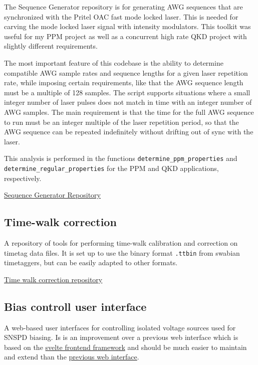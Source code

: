 \documentclass[11pt]{caltech_thesis} %
\begin{document}
The Sequence Generator repository is for generating AWG sequences that are synchronized with the Pritel OAC fast mode locked laser. This is needed for carving the mode locked laser signal with intensity modulators. This toolkit was useful for my PPM project as well as a concurrent high rate QKD project with slightly different requirements.

The most important feature of this codebase is the ability to determine compatible AWG sample rates and sequence lengths for a given laser repetition rate, while imposing certain requirements, like that the AWG sequence length must be a multiple of 128 samples. The script supports situations where a small integer number of laser pulses does not match in time with an integer number of AWG samples. The main requirement is that the time for the full AWG sequence to run must be an integer multiple of the laser repetition period, so that the AWG sequence can be repeated indefinitely without drifting out of sync with the laser.

This analysis is performed in the functions \texttt{determine\_ppm\_properties} and \texttt{determine\_regular\_properties} for the PPM and QKD applications, respectively.

\href{https://github.com/sansseriff/sequence_generator/tree/main}{Sequence Generator Repository}

\hypertarget{time-walk-correction-1}{%
\subsection{Time-walk correction}\label{time-walk-correction-1}}

A repository of tools for performing time-walk calibration and correction on timetag data files. It is set up to use the binary format \texttt{.ttbin} from swabian timetaggers, but can be easily adapted to other formats.

\href{https://github.com/sansseriff/SNSPD-time-walk-and-jitter-correction}{Time walk correction repository}

\hypertarget{bias-controll-user-interface}{%
\subsection{Bias controll user interface}\label{bias-controll-user-interface}}

A web-based user interfaces for controlling isolated voltage sources used for SNSPD biasing. Is is an improvement over a previous web interface which is based on the \href{https://svelte.dev/}{svelte frontend framework} and should be much easier to maintain and extend than the \href{https://github.com/sansseriff/Isolated_Vsource}{previous web interface}.
\end{document}

